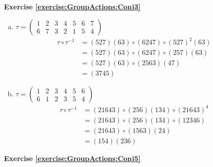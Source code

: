 \noindent\textbf{Exercise \ref{exercise:GroupActions:Conj3}}
\begin{enumerate}[(a)]
\item 
$\tau=\begin{pmatrix}1&2&3&4&5&6&7\\6&7&3&2&1&5&4
\end{pmatrix}$
\begin{align*}
\tau \circ \tau^{-1} &= (527)(63) \circ (6247) \circ (527)^2 (63)
\\
&= (527)(63) \circ (6247)\circ (257)(63)
\\
&= (527)(63) \circ (2563)(47)
\\
&= (3745)
\end{align*}

\item
$\tau=\begin{pmatrix}1&2&3&4&5&6\\6&1&2&3&5&4
\end{pmatrix}$
\begin{align*}
\tau \circ \tau^{-1} &= (21643) \circ (256)(134) \circ (21643)^4
\\
&= (21643) \circ (256)(134) \circ (12346)
\\
&= (21643) \circ (1563)(24)
\\
&= (154)(236)
\end{align*}

\end{enumerate}

\noindent\textbf{Exercise \ref{exercise:GroupActions:Conj5}}


